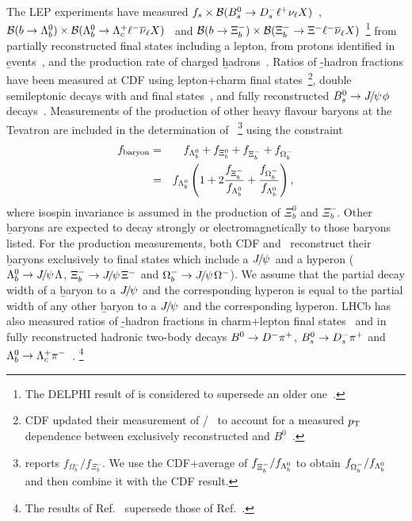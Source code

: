 The LEP experiments have measured
$f_{s} \times {\cal B}(B^0_s\to D_s^- \ell^+ \nu_\ell \mbox{$X$})$~\cite{Abreu:1992rv,*Acton:1992zq,*Buskulic:1995bd}, 
$\BR{\b\to\Lb} \times \BR{\Lb\to\Lc\ell^-\bar{\nu}_\ell \mbox{$X$}}$~\cite{Abreu:1995me,Barate:1997if}
and ${\cal B}(b\to\Xi_b^-) \times {\cal B}(\Xi_b^- \to \Xi^-\ell^-\overline\nu_\ell 
\mbox{$X$})$~\cite{Buskulic:1996sm,Abdallah:2005cw}\footnote{
  \label{foot:life_mix:Abdallah:2005cw}
  The DELPHI result of  is considered to supersede an older one~\cite{Abreu:1995kt}.
} 
from partially reconstructed final states including a lepton, \fbb
from protons identified in \b events~\cite{Barate:1997ty}, and the 
production rate of charged \b hadrons~\cite{Abdallah:2003xp}. 
Ratios of \b-hadron fractions have been measured at CDF using 
lepton+charm final 
states~\cite{Affolder:1999iq,Aaltonen:2008zd,Aaltonen:2008eu}\footnote{
  \label{foot:life_mix:Affolder:1999iq}
  CDF updated their measurement of \fLb/\fBd~\cite{Affolder:1999iq} to account 
  for a measured $p_{\rm T}$ dependence between exclusively reconstructed 
  \Lb and $B^0$~\cite{Aaltonen:2008eu}.
}, double semileptonic decays 
with  and \particle{\phi\mu\mu}
final states~\cite{Abe:1999ta},
and fully reconstructed $B^0_s\to{J\mskip -3mu/\mskip -2mu\psi\mskip 2mu}\phi$ decays~\cite{CDFnote10795:2012}.
Measurements of the production of other heavy 
flavour baryons at the Tevatron are included in the determination of 
\fbb~\cite{Abazov_mod:2007ub,Abazov:2008qm,Aaltonen:2009ny}\footnote{
  \label{foot:life_mix:Abazov:2008qm}
  \dzero reports $f_{\Omega_b^-}/f_{\Xi_b^-}$.  We use the CDF+\dzero average of 
  $f_{\Xi_b^-}/f_{\Lambda_b^0}$ to obtain $f_{\Omega_b^-}/f_{\Lambda_b^0}$ and then 
  combine it with the CDF result.
} using the constraint
\begin{eqnarray}
f_{\rm baryon} & = & f_{\Lambda_b^0} + f_{\Xi_b^0} + f_{\Xi_b^-} + f_{\Omega_b^-} 
     \nonumber \\
     & = & f_{\Lambda_b^0}\left(1 + 2\frac{f_{\Xi_b^-}}{f_{\Lambda_b^0}} 
           + \frac{f_{\Omega_b^-}}{f_{\Lambda_b^0}}\right),
\end{eqnarray}
where isospin invariance is assumed in the production of $\Xi_b^0$ and 
$\Xi_b^-$. Other \b baryons are expected to decay strongly or 
electromagnetically to those baryons listed. For the production 
measurements, both CDF and \dzero\ reconstruct their \b baryons exclusively 
to final states which include a ${J\mskip -3mu/\mskip -2mu\psi\mskip 2mu}$ and a hyperon 
($\Lambda_b^0\to {J\mskip -3mu/\mskip -2mu\psi\mskip 2mu} \Lambda$, 
$\Xi_b^- \rightarrow {J\mskip -3mu/\mskip -2mu\psi\mskip 2mu} \Xi^-$ and 
$\Omega_b^- \rightarrow {J\mskip -3mu/\mskip -2mu\psi\mskip 2mu} \Omega^-$).  
We assume that the partial decay width of a \b baryon to a ${J\mskip -3mu/\mskip -2mu\psi\mskip 2mu}$ and the 
corresponding hyperon is equal to the partial width of any other \b baryon to 
a ${J\mskip -3mu/\mskip -2mu\psi\mskip 2mu}$ and the corresponding hyperon.  LHCb has also measured
ratios of \b-hadron fractions in charm+lepton final states~\cite{Aaij:2011jp} 
and in fully reconstructed hadronic two-body decays $B^0 \to D^-\pi^+$, $B^0_s \to D_s^- \pi^+$ and 
$\Lambda_b^0 \to \Lambda_c^+ \pi^-$~\cite{Aaij:2013qqa,Aaij:2014jyk}.%
\footnote{
  \label{foot:life_mix:Aaij:2013qqa}
  The results of Ref.~\cite{Aaij:2013qqa} supersede those of Ref.~\cite{Aaij:2011hi}.
}


